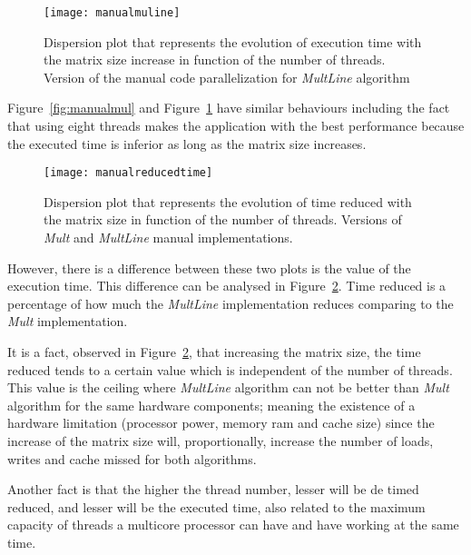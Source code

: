 \begin{figure}[htb]
	\begin{center}
		\leavevmode
		\texttt{[image: manualmuline]}
		\caption{Dispersion plot that represents the evolution of execution time with the matrix size increase in function of the number of threads. Version of the manual code parallelization for \textsl{MultLine} algorithm}
		\label{fig:manualmuline}
	\end{center}
\end{figure}

Figure~\ref{fig:manualmul} and Figure~\ref{fig:manualmuline} have similar behaviours including the fact that using eight threads makes the application with the best performance because the executed time is inferior as long as the matrix size increases.

\begin{figure}[htb]
	\begin{center}
		\leavevmode
		\texttt{[image: manualreducedtime]}
		\caption{Dispersion plot that represents the evolution of time reduced with the matrix size in function of the number of threads. Versions of \textit{Mult} and \textit{MultLine} manual implementations. }
		\label{fig:manualreducedtime}
	\end{center}
\end{figure}

However, there is a difference between these two plots is the value of the execution time. This difference can be analysed in Figure~\ref{fig:manualreducedtime}. Time reduced is a percentage of how much the \textit{MultLine} implementation reduces comparing to the \textit{Mult} implementation. 

It is a fact, observed in Figure~\ref{fig:manualreducedtime}, that increasing the matrix size, the time reduced tends to a certain value which is independent of the number of threads. This value is the ceiling where \textit{MultLine} algorithm can not be better than \textit{Mult} algorithm for the same hardware components; meaning the existence of a hardware limitation (processor power, memory ram and cache size) since the increase of the matrix size will, proportionally, increase the number of loads, writes and cache missed for both algorithms.

Another fact is that the higher the thread number, lesser will be de timed reduced, and lesser will be the executed time, also related to the maximum capacity of threads a multicore processor can have and have working at the same time.

